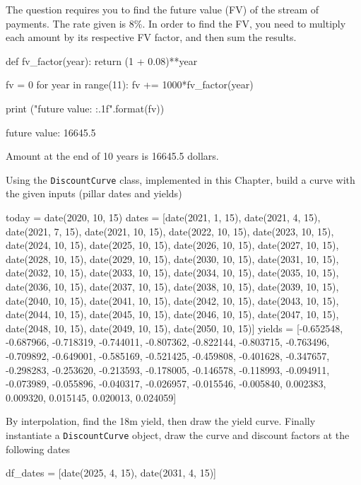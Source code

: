 \cprotEnv\begin{solution}
	The question requires you to find the future value (FV) of the stream of payments. The rate given is 8\%.
	In order to find the FV, you need to multiply each amount by its respective FV factor, and then sum the results.
	
	\begin{ipython}
		def fv_factor(year):
		return (1 + 0.08)**year
		
		fv = 0
		for year in range(11):
		fv += 1000*fv_factor(year)
		
		print ("future value: {:.1f}".format(fv))
	\end{ipython}
	\begin{ioutput}
		future value: 16645.5
	\end{ioutput}
	Amount at the end of 10 years is 16645.5 dollars.
\end{solution}

\cprotEnv\begin{question}
\label{ex:yield_discount}
Using the \texttt{DiscountCurve} class, implemented in this Chapter, build a curve with the given inputs (pillar dates and yields)

\begin{ipython}
today = date(2020, 10, 15)
dates = [date(2021, 1, 15), date(2021, 4, 15), date(2021, 7, 15),
         date(2021, 10, 15), date(2022, 10, 15), date(2023, 10, 15),
         date(2024, 10, 15), date(2025, 10, 15), date(2026, 10, 15),
         date(2027, 10, 15), date(2028, 10, 15), date(2029, 10, 15),
         date(2030, 10, 15), date(2031, 10, 15), date(2032, 10, 15),
         date(2033, 10, 15), date(2034, 10, 15), date(2035, 10, 15),
         date(2036, 10, 15), date(2037, 10, 15), date(2038, 10, 15),
         date(2039, 10, 15), date(2040, 10, 15), date(2041, 10, 15),
         date(2042, 10, 15), date(2043, 10, 15), date(2044, 10, 15),
         date(2045, 10, 15), date(2046, 10, 15), date(2047, 10, 15),
         date(2048, 10, 15), date(2049, 10, 15), date(2050, 10, 15)]
yields = [-0.652548, -0.687966, -0.718319, -0.744011, -0.807362,
          -0.822144, -0.803715, -0.763496, -0.709892, -0.649001,
          -0.585169, -0.521425, -0.459808, -0.401628, -0.347657,
          -0.298283, -0.253620, -0.213593, -0.178005, -0.146578,
          -0.118993, -0.094911, -0.073989, -0.055896, -0.040317,
          -0.026957, -0.015546, -0.005840,  0.002383,  0.009320,
           0.015145,  0.020013,  0.024059]
\end{ipython}
\noindent
By interpolation, find the 18m yield, then draw the yield curve. Finally instantiate a \texttt{DiscountCurve} object, draw the curve and discount factors at the following dates
\begin{ipython}
df_dates = [date(2025, 4, 15), date(2031, 4, 15)]
\end{ipython}
\end{question}

